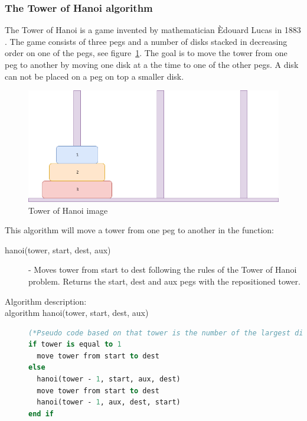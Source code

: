 \documentclass {article}
\begin{document}
\subsubsection{The Tower of Hanoi algorithm}
\label{sec:hanoi}
The Tower of Hanoi is a game invented by mathematician \`{E}douard Lucas in 1883 \cite{hanoi}. The game consists of three pegs and a number of disks stacked in decreasing order on one of the pegs, see figure~\ref{fig:tower-of-hanoi-example}. The goal is to move the tower from one peg to another by moving one disk at a the time to one of the other pegs. A disk can not be placed on a peg on top a smaller disk. 

\begin{figure}[H]
\includegraphics[width=\textwidth]{tower-of-hanoi-example}

\caption{Tower of Hanoi image}
\label{fig:tower-of-hanoi-example}
\end{figure}

This algorithm will move a tower from one peg to another in the function:

\begin{description}
\item[hanoi(tower, start, dest, aux)] - Moves tower from start to dest following the rules of the Tower of Hanoi problem. Returns the start, dest and aux pegs with the repositioned tower.


\item[Algorithm description:]
\item[algorithm hanoi(tower, start, dest, aux)]
\item[] 
\begin{lstlisting}[language=Pascal]
(*Pseudo code based on that tower is the number of the largest disk, where 1 is the smallest disk in the tower.*)
if tower is equal to 1
  move tower from start to dest
else
  hanoi(tower - 1, start, aux, dest)
  move tower from start to dest
  hanoi(tower - 1, aux, dest, start)
end if
\end{lstlisting}
\end{description}
\end{document}
